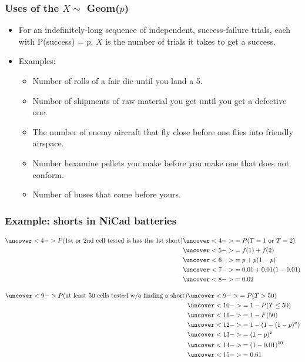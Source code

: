 \documentclass[handout]{beamer}\usepackage[]{graphicx}\usepackage[]{color}
\numberwithin{equation}{section}
\begin{document}
\begin{frame}
\frametitle{Uses of the $X \sim$ Geom($p$)}
\begin{itemize}
\pause \item For an indefinitely-long sequence of independent, success-failure trials, each with P(success) = $p$, $X$ is the number of trials it takes to get a success.
\pause \item Examples:
\begin{itemize}
\pause \item Number of rolls of a fair die until you land a 5.
\pause \item Number of shipments of raw material you get until you get a defective one.
\pause \item The number of enemy aircraft that fly close before one flies into friendly airspace.
\pause \item Number hexamine pellets you make before you make one that does not conform.
\pause \item Number of buses that come before yours.
\end{itemize}
\end{itemize}
\end{frame}


\begin{frame}
\frametitle{Example: shorts in NiCad batteries} \scriptsize

\begin{itemize}
\end{itemize}

\begin{align*}
\uncover<4->{ P(\text{1st or 2nd cell tested is has the 1st short})} &\uncover<4->{ = P(T = 1 \text{ or } T = 2)} \\
&\uncover<5->{  = f(1) + f(2)} \\
&\uncover<6->{  = p + p(1-p)} \\
&\uncover<7->{  = 0.01 + 0.01 (1 - 0.01)} \\
&\uncover<8->{  = 0.02}
\end{align*}

\begin{align*}
\uncover<9->{ P(\text{at least 50 cells tested w/o finding a short})} &\uncover<9->{ = P(T > 50)} \\
&\uncover<10->{  = 1 - P(T \le 50)} \\
&\uncover<11->{  = 1 - F(50) }\\
&\uncover<12->{  = 1 - (1 - (1-p)^x)} \\
&\uncover<13->{  = (1-p)^x} \\
& \uncover<14->{ = (1 - 0.01)^{50}} \\
&\uncover<15->{  = 0.61}
\end{align*}
\end{frame}
\end{document}
